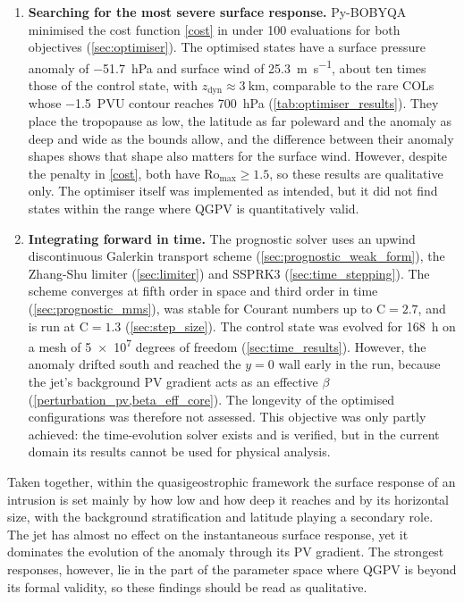 \documentclass{article}
\begin{document}
\begin{enumerate}
    \item \textbf{Searching for the most severe surface response.}
    Py-BOBYQA minimised the cost function \cref{cost} in under 100 evaluations for both objectives (\cref{sec:optimiser}).
    The optimised states have a surface pressure anomaly of \qty{-51.7}{\hecto\pascal} and surface wind of \qty{25.3}{\meter\per\second}, about ten times those of the control state, with $z_\text{dyn} \approx \qty{3}{\kilo\meter}$, comparable to the rare COLs whose \qty{-1.5}{PVU} contour reaches \qty{700}{\hecto\pascal} \cite{Barnes2021col} (\cref{tab:optimiser_results}).
    They place the tropopause as low, the latitude as far poleward and the anomaly as deep and wide as the bounds allow, and the difference between their anomaly shapes shows that shape also matters for the surface wind.
    However, despite the penalty in \cref{cost}, both have $\mathrm{Ro}_\text{max} \geq 1.5$, so these results are qualitative only.
    The optimiser itself was implemented as intended, but it did not find states within the range where QGPV is quantitatively valid.

    \item \textbf{Integrating forward in time.}
    The prognostic solver uses an upwind discontinuous Galerkin transport scheme (\cref{sec:prognostic_weak_form}), the Zhang-Shu limiter (\cref{sec:limiter}) and SSPRK3 (\cref{sec:time_stepping}).
    The scheme converges at fifth order in space and third order in time (\cref{sec:prognostic_mms}), was stable for Courant numbers up to $\mathrm{C} = 2.7$, and is run at $\mathrm{C} = 1.3$ (\cref{sec:step_size}).
    The control state was evolved for \qty{168}{\hour} on a mesh of \num{5e7} degrees of freedom (\cref{sec:time_results}).
    However, the anomaly drifted south and reached the $y = 0$ wall early in the run, because the jet's background PV gradient acts as an effective $\beta$ (\cref{perturbation_pv,beta_eff_core}).
    The longevity of the optimised configurations was therefore not assessed.
    This objective was only partly achieved: the time-evolution solver exists and is verified, but in the current domain its results cannot be used for physical analysis.
\end{enumerate}

Taken together, within the quasigeostrophic framework the surface response of an intrusion is set mainly by how low and how deep it reaches and by its horizontal size, with the background stratification and latitude playing a secondary role.
The jet has almost no effect on the instantaneous surface response, yet it dominates the evolution of the anomaly through its PV gradient.
The strongest responses, however, lie in the part of the parameter space where QGPV is beyond its formal validity, so these findings should be read as qualitative.
\end{document}
